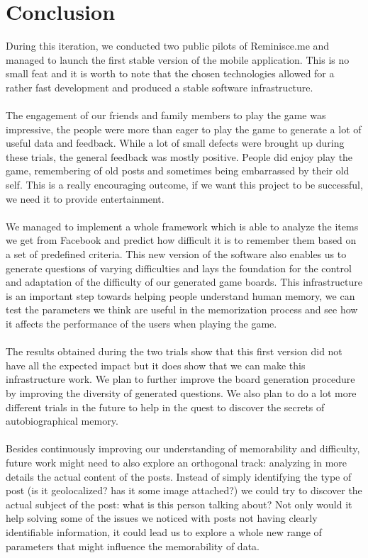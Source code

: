 \chapter{Conclusion}
During this iteration, we conducted two public pilots of Reminisce.me and managed to launch the first stable version of the mobile application. This is no small feat and it is worth to note that the chosen technologies allowed for a rather fast development and produced a stable software infrastructure.\\\\
The engagement of our friends and family members to play the game was impressive, the people were more than eager to play the game to generate a lot of useful data and feedback. While a lot of small defects were brought up during these trials, the general feedback was mostly positive. People did enjoy play the game, remembering of old posts and sometimes being embarrassed by their old self. This is a really encouraging outcome, if we want this project to be successful, we need it to provide entertainment.\\\\
We managed to implement a whole framework which is able to analyze the items we get from Facebook and predict how difficult it is to remember them based on a set of predefined criteria. This new version of the software also enables us to generate questions of varying difficulties and lays the foundation for the control and adaptation of the difficulty of our generated game boards. This infrastructure is an important step towards helping people understand human memory, we can test the parameters we think are useful in the memorization process and see how it affects the performance of the users when playing the game.\\\\
The results obtained during the two trials show that this first version did not have all the expected impact but it does show that we can make this infrastructure work. We plan to further improve the board generation procedure by improving the diversity of generated questions. We also plan to do a lot more different trials in the future to help in the quest to discover the secrets of autobiographical memory.\\\\
Besides continuously improving our understanding of memorability and difficulty, future work might need to also explore an orthogonal track: analyzing in more details the actual content of the posts. Instead of simply identifying the type of post (is it geolocalized? has it some image attached?) we could try to discover the actual subject of the post: what is this person talking about? Not only would it help solving some of the issues we noticed with posts not having clearly identifiable information, it could lead us to explore a whole new range of parameters that might influence the memorability of data.\\\\
